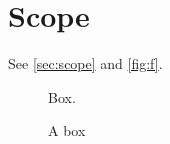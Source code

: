 \documentclass{article}
\begin{document}
\section{Scope}\label{sec:scope}
See \autoref{sec:scope} and \autoref{fig:f}.
\begin{figure}[h]
\centering
Box.
\caption{A box}\label{fig:f}
\end{figure}
\end{document}
